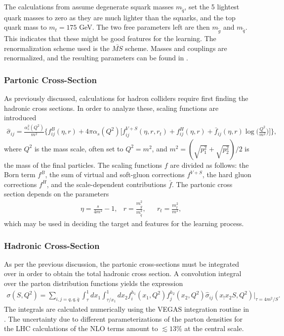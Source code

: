 \documentclass[twoside,english]{uiofysmaster}
\begin{document}
The calculations from \cite{beenakker1997squark} assume degenerate squark masses $m_{\tilde{q}}$, set the 5 lightest quark masses to zero as they are much lighter than the squarks, and the top quark mass to $m_t =175$ GeV. The two free parameters left are then $m_{\tilde{g}}$ and $m_{\tilde{q}}$. This indicates that these might be good features for the learning. The renormalization scheme used is the $\bar{MS}$ scheme. Masses and couplings are renormalized, and the resulting parameters can be found in \cite{beenakker1997squark}.

\subsubsection{Partonic Cross-Section}

As previously discussed, calculations for hadron colliders require first finding the hadronic cross sections. In order to analyze these, scaling functions are introduced \cite{beenakker1997squark}
\begin{align}
\hat{\sigma}_{ij} = \frac{\alpha_s^2(Q^2)}{m^2} \Big\{ f^B_{ij}(\eta, r) + 4 \pi \alpha_s (Q^2) \Bigg[ f_{ij}^{V+S}(\eta, r, r_t) + f_{ij}^H (\eta, r) + \bar{f}_{ij} (\eta, r) \log \Bigg( \frac{Q^2}{m^2}\Bigg) \Bigg] \Big\}
,
\end{align}
where $Q^2$ is the mass scale, often set to $Q^2 = m^2$, and $m^2 = (\sqrt{p_1^2} + \sqrt{p_2^2})/2$ is the mass of the final particles. The scaling functions $f$ are divided as follows: the Born term $f^B$, the sum of virtual and soft-gluon corrections $f^{V+S}$, the hard gluon corrections $f^H$, and the scale-dependent contributions $\bar{f}$. The partonic cross section depends on the parameters
\begin{align}
&\eta = \frac{s}{4m^2} -1, &r= \frac{m_{\tilde{g}}^2}{m_{\tilde{q}}^2}, &&r_t = \frac{m_t^2}{m^2},
\end{align}
which may be used in deciding the target and features for the learning process.

\subsubsection{Hadronic Cross-Section}

As per the previous discussion, the partonic cross-sections must be integrated over in order to obtain the total hadronic cross section. A convolution integral over the parton distribution functions yields the expression 
\begin{align}
\sigma(S, Q^2) = \sum_{i,j=q, q, \bar{q}} \int_{\tau}^1dx_1 \int_{\tau/x_1}^1 dx_2 f_i^{h_1} (x_1, Q^2) f_j^{h_2}(x_2, Q^2) \hat{\sigma}_{ij} (x_!x_2S, Q^2)\Big|_{\tau=4m^2/S}.
\end{align}
The integrals are calculated numerically using the VEGAS integration routine \cite{PETERLEPAGE1978192} in \cite{beenakker1997squark}.
The uncertainty due to different parameterizations of the parton densities for the LHC calculations of the NLO terms amount to $\lesssim 13 \%$ at the central scale.
\end{document}
